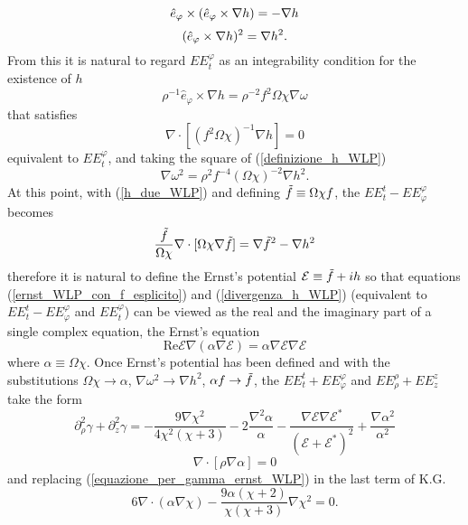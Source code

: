 \begin{equation}
    \hat{e}_{\varphi} \times (\hat{e}_{\varphi} \times \nabla h) = -\nabla h \notag
\end{equation}
\begin{equation}
    (\hat{e}_{\varphi} \times \nabla h)^2 = \nabla h^2. \notag
\end{equation}
From this it is natural to regard $EE^{\varphi}_t$ as an integrability condition for the existence of $h$ 
\begin{equation}
    \rho^{-1}\hat{e}_{\varphi} \times \nabla h = \rho^{-2}f^2\Omega\chi \nabla\omega 
    \label{definizione_h_WLP}
\end{equation}
that satisfies 
\begin{equation}
    \nabla\cdot\left[(f^2\Omega\chi)^{-1}\nabla h \right] = 0
    \label{divergenza_h_WLP}
\end{equation}
equivalent to $EE^{\varphi}_t$, and taking the square of (\ref{definizione_h_WLP})
\begin{equation}
    \nabla\omega^2 = \rho^2f^{-4}(\Omega\chi)^{-2}\nabla h^2.
    \label{h_due_WLP}
\end{equation}
At this point, with (\ref{h_due_WLP}) and defining $\Tilde{f} \equiv \Omega\chi f$, the $EE^t_t- EE^{\varphi}_{\varphi}$ becomes 
\begin{equation}
        \frac{\Tilde{f}}{\Omega\chi}\nabla\cdot[\Omega\chi\nabla\Tilde{f}]=\nabla\Tilde{f}^2-\nabla h^2
        \label{ernst_WLP_con_f_esplicito}
\end{equation}
 therefore it is natural to define the Ernst's potential $\mathcal{E} \equiv \Tilde{f}+ ih$ so that equations (\ref{ernst_WLP_con_f_esplicito}) and (\ref{divergenza_h_WLP}) (equivalent to  $EE^t_t- EE^{\varphi}_{\varphi}$ and $EE^{\varphi}_t$) can be viewed as the real and the imaginary part of a single complex equation, the Ernst's equation
\begin{equation}
    \mathrm{Re}\mathcal{E}\nabla(\alpha\nabla\mathcal{E})=\alpha\nabla\mathcal{E}\nabla\mathcal{E}
    \label{Ernst_CC_WLP}
\end{equation}
where $\alpha \equiv \Omega\chi$. Once Ernst's potential has been defined and with the substitutions $\Omega\chi \rightarrow \alpha$, $\nabla\omega^2 \rightarrow \nabla h^2$, $\alpha f\rightarrow \Tilde{f}$, the  $EE^t_t+ EE^{\varphi}_{\varphi}$ and $EE^{\rho}_{\rho}+EE^{z}_{z}$ take the form
\begin{equation}
    \partial^2_{\rho}\gamma + \partial^2_z \gamma = -\frac{9 \nabla\chi ^2}{4\chi^2(\chi+3)} - 2\frac{\nabla^2\alpha}{\alpha} - \frac{\nabla\mathcal{E}\nabla\mathcal{E}^*}{(\mathcal{E} + \mathcal{E}^*)^2} + \frac{\nabla \alpha ^2}{\alpha^2}
    \label{equazione_per_gamma_ernst_WLP}
\end{equation}
\begin{equation}
    \nabla\cdot[\rho\nabla\alpha]=0
    \label{equazione_alpha_WLP}
\end{equation}
and replacing (\ref{equazione_per_gamma_ernst_WLP}) in the last term of K.G. 
\begin{equation}
    6\nabla\cdot(\alpha\nabla\chi) - \frac{9\alpha(\chi +2)}{\chi(\chi + 3)}\nabla\chi^2 = 0.
    \label{K.G._ernst_WLP}
\end{equation}
